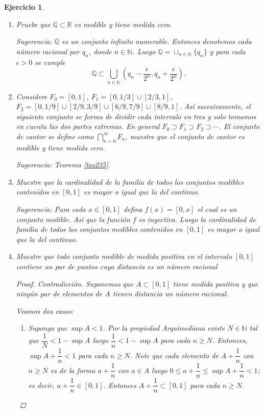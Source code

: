 \documentclass[twoside,12pt,a4 paper,openright]{book}
\newtheorem{ejer}[claim]{Ejercicio}
\begin{document}
\begin{ejer}
\begin{enumerate}
\item Pruebe que $\mathbb{Q}\subset\mathbb{R}$ es medible y tiene medida cero. 
  

  Sugerencia:   $\mathbb Q$ es un conjunto infinito numerable. Entonces denotemos cada n\'umero racional por  $q_n$, donde $n\in \mathbb N$. Luego 
  $ \mathbb Q=\cup_{n\in \mathbb N}\{q_n\} $ y para cada $\epsilon >0$ se cumple  
  $$ \mathbb Q \subset \bigcup_{n\in \mathbb N} (q_n- \frac{\epsilon}{2^n }, q_n+ \frac{\epsilon}{2^n }). $$  


\item Considere $F_0 = [0,1]$, $F_1 = [0,1/3]\cup [2/3,1]$, $F_2 = [0,1/9]\cup[2/9,3/9]\cup[6/9,7/9]\cup[8/9,1]$. As\'i sucesivamente, el siguiente conjunto se forma de dividir cada intervalo en tres y solo tomamos en cuenta las dos partes extremas. En general $F_0\supset F_1\supset F_2\supset \cdots$. El conjunto de cantor se define como $\bigcap_{n=0}^{\infty}F_n$, muestre que el conjunto de cantor es medible y tiene medida cero.

Sugerencia: Teorema \ref{teo235}.


\item Muestre que la cardinalidad de la familia de todos los conjuntos medibles contenidos en $[0,1]$ es mayor o igual  que la del continuo.

Sugerencia: Para cada $x\in [0,1]$ defina $f(x) =[0,x]$ el cual es un conjunto medible. As\'i que la funci\'on $f$ es inyectiva. Luego la cardinalidad de familia de todos los conjuntos medibles contenidos en $[0,1]$ es mayor o igual  que la del continuo.


\item Muestre que todo conjunto medible de medida positiva en el intervalo $[0,1]$ contiene un par de puntos cuya distancia es un n\'umero racional

\begin{proof}

\noindent
Contradicci\'on.  Suponemos que $A\subset [0,1]$ tiene medida positiva  y que ning\'un par de elementos de  $A$ tienen distancia un n\'umero racional. 

Veamos dos casos: 

\begin{enumerate}
\item  Suponga que $\sup A<1$. Por la propiedad Arquimediana existe $N\in \mathbb N$ tal que  $\dfrac{1}{N}< 1- \sup A  $ luego  $ \dfrac{1}{n}< 1- \sup A   $ para  cada $n\geq N$. Entonces,  $\sup A +  \dfrac{1}{n} < 1 $ para cada $n\geq N$. Note que cada elemento de $ A +  \dfrac{1}{n}  $  con   $n\geq N$ es de la forma $a+\dfrac{1}{n}$ con $a\in A$ luego   $0\leq a+ \dfrac{1}{n} \leq \sup A +  \dfrac{1}{n} < 1 $; es decir, 
  $a+ \dfrac{1}{n} \in [0,1]$. Entonces  $ A +  \dfrac{1}{n} \subset [0,1] $  para cada    $n\geq N$.
  

\end{enumerate}
\end{proof}
\end{enumerate}
\end{ejer}
\end{document}
